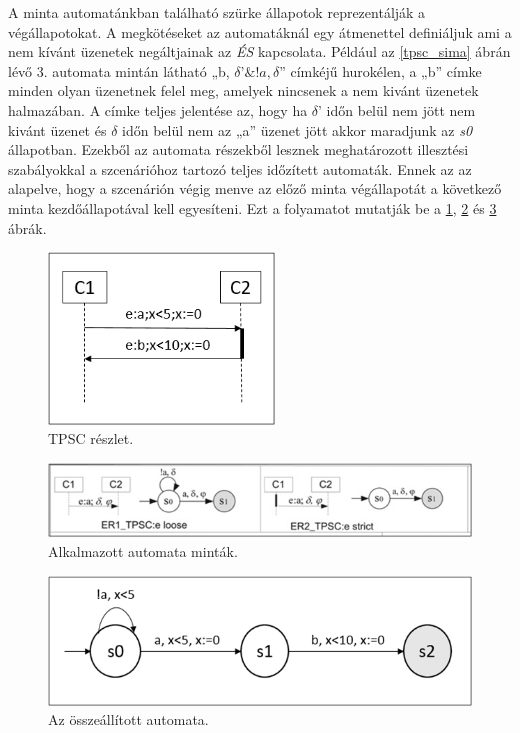 A minta automatánkban található szürke állapotok reprezentálják a végállapotokat.
A megkötéseket az automatáknál egy átmenettel definiáljuk ami a nem kívánt üzenetek negáltjainak az \textit{ÉS} kapcsolata.
Például az \ref{tpsc_sima} ábrán lévő 3. automata mintán látható „b, $\delta ’\&!a, \delta$” címkéjű hurokélen, a „b” címke minden olyan üzenetnek felel meg, amelyek nincsenek a nem kivánt üzenetek halmazában.
A címke teljes jelentése az, hogy ha $\delta$’ időn belül nem jött nem kivánt üzenet és $\delta$ időn belül nem az „a” üzenet jött akkor maradjunk az \textit{s0} állapotban.
Ezekből az automata részekből lesznek meghatározott illesztési szabályokkal a szcenárióhoz tartozó teljes időzített automaták.
Ennek az az alapelve, hogy a szcenárión végig menve az előző minta végállapotát a következő minta kezdőállapotával kell egyesíteni.
Ezt a folyamatot mutatják be a \ref{tpsc_subset}, \ref{tpsc_used_patterns} és \ref{created_automaton} ábrák.

\begin{figure}[!ht]
    \centering
    \includegraphics[width=60mm, keepaspectratio]{figures/7abra.png}
    \caption{TPSC részlet.}
    \label{tpsc_subset}
\end{figure}

\begin{figure}[!ht]
    \centering
    \includegraphics[width=150mm, keepaspectratio]{figures/8abra.png}
    \caption{Alkalmazott automata minták.}
    \label{tpsc_used_patterns}
\end{figure}

\begin{figure}[!ht]
    \centering
    \includegraphics[width=130mm, keepaspectratio]{figures/9abra.png}
    \caption{Az összeállított automata.}
    \label{created_automaton}
\end{figure}

